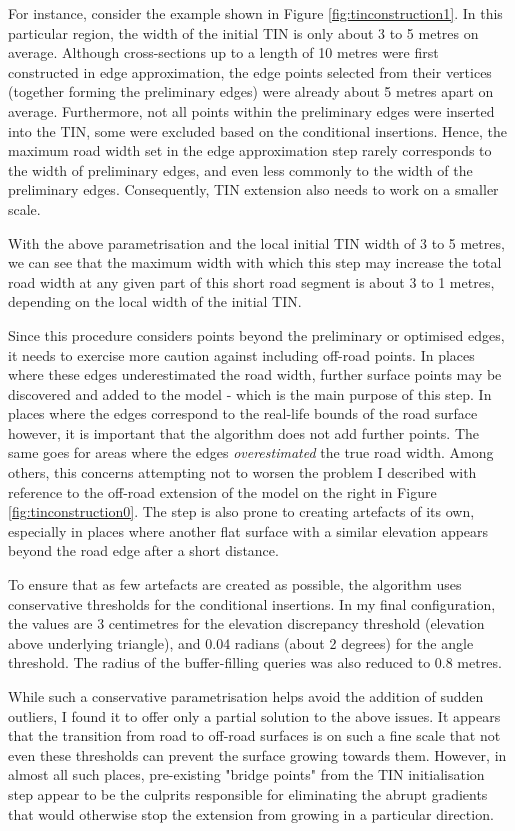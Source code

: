 For instance, consider the example shown in Figure \ref{fig:tinconstruction1}. In this particular region, the width of the initial TIN is only about 3 to 5 metres on average. Although cross-sections up to a length of 10 metres were first constructed in edge approximation, the edge points selected from their vertices (together forming the preliminary edges) were already about 5 metres apart on average. Furthermore, not all points within the preliminary edges were inserted into the TIN, some were excluded based on the conditional insertions. Hence, the maximum road width set in the edge approximation step rarely corresponds to the width of preliminary edges, and even less commonly to the width of the preliminary edges. Consequently, TIN extension also needs to work on a smaller scale.

With the above parametrisation and the local initial TIN width of 3 to 5 metres, we can see that the maximum width with which this step may increase the total road width at any given part of this short road segment is about 3 to 1 metres, depending on the local width of the initial TIN.

Since this procedure considers points beyond the preliminary or optimised edges, it needs to exercise more caution against including off-road points. In places where these edges underestimated the road width, further surface points may be discovered and added to the model - which is the main purpose of this step. In places where the edges correspond to the real-life bounds of the road surface however, it is important that the algorithm does not add further points. The same goes for areas where the edges \textit{overestimated} the true road width. Among others, this concerns attempting not to worsen the problem I described with reference to the off-road extension of the model on the right in Figure \ref{fig:tinconstruction0}. The step is also prone to creating artefacts of its own, especially in places where another flat surface with a similar elevation appears beyond the road edge after a short distance.

To ensure that as few artefacts are created as possible, the algorithm uses conservative thresholds for the conditional insertions. In my final configuration, the values are 3 centimetres for the elevation discrepancy threshold (elevation above underlying triangle), and 0.04 radians (about 2 degrees) for the angle threshold. The radius of the buffer-filling queries was also reduced to 0.8 metres.

While such a conservative parametrisation helps avoid the addition of sudden outliers, I found it to offer only a partial solution to the above issues. It appears that the transition from road to off-road surfaces is on such a fine scale that not even these thresholds can prevent the surface growing towards them. However, in almost all such places, pre-existing "bridge points" from the TIN initialisation step appear to be the culprits responsible for eliminating the abrupt gradients that would otherwise stop the extension from growing in a particular direction.

